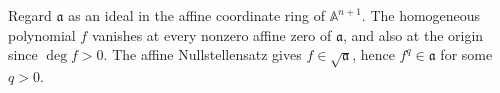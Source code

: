 Regard $\mathfrak a$ as an ideal in the affine coordinate ring of $\mathbb A^{n+1}$. The homogeneous polynomial $f$ vanishes at every nonzero affine zero of $\mathfrak a$, and also at the origin since $\deg f>0$. The affine Nullstellensatz gives $f\in\sqrt{\mathfrak a}$, hence $f^q\in\mathfrak a$ for some $q>0$.
